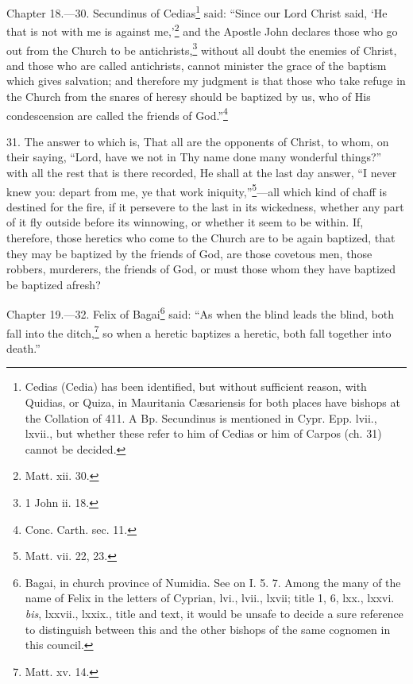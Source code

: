 
Chapter 18.—30. Secundinus of Cedias\footnote{\par  Cedias (Cedia) has been identified, but without sufficient reason, with Quidias, or Quiza, in Mauritania Cæsariensis for both places have bishops at the Collation of 411. A Bp. Secundinus is mentioned in Cypr. Epp. lvii., lxvii., but whether these refer to him of Cedias or him of Carpos (ch. 31) cannot be decided.} said: ``Since our Lord Christ said, ‘He that is not with me is against me,’\footnote{\par  Matt. xii. 30.} and the Apostle John declares those who go out from the Church to be antichrists,\footnote{\par  1 John ii. 18.} without all doubt the enemies of Christ, and those who are called antichrists, cannot minister the grace of the baptism which gives salvation; and therefore my judgment is that those who take refuge in the Church from the snares of heresy should be baptized by us, who of His condescension are called the friends of God.''\footnote{\par  Conc. Carth. sec. 11.}

31. The answer to which is, That all are the opponents of Christ, to whom, on their saying, ``Lord, have we not in Thy name done many wonderful things?'' with all the rest that is there recorded, He shall at the last day answer, ``I never knew you: depart from me, ye that work iniquity,''\footnote{\par  Matt. vii. 22, 23.}—all which kind of chaff is destined for the fire, if it persevere to the last in its wickedness, whether any part of it fly outside before its winnowing, or whether it seem to be within. If, therefore, those heretics who come to the Church are to be again baptized, that they may be baptized by the friends of God, are those covetous men, those robbers, murderers, the friends of God, or must those whom they have baptized be baptized afresh?


Chapter 19.—32. Felix of Bagai\footnote{\par  Bagai, in church province of Numidia. See on I. 5. 7. Among the many of the name of Felix in the letters of Cyprian, lvi., lvii., lxvii; title 1, 6, lxx., lxxvi. \emph{bis}, lxxvii., lxxix., title and text, it would be unsafe to decide a sure reference to distinguish between this and the other bishops of the same cognomen in this council.} said: ``As when the blind leads the blind, both fall into the ditch,\footnote{\par  Matt. xv. 14.} so when a heretic baptizes a heretic, both fall together into death.''

